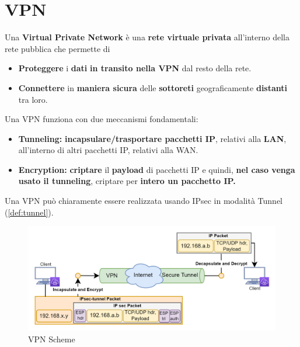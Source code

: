 \section{VPN}
Una \textbf{Virtual Private Network} è una \textbf{rete virtuale privata} all'interno della rete pubblica che permette di 
\begin{itemize}
    \item \textbf{Proteggere} i \textbf{dati} \textbf{in transito nella VPN} dal resto della rete.
    \item \textbf{Connettere} in \textbf{maniera sicura} delle \textbf{sottoreti} geograficamente \textbf{distanti} tra loro.
\end{itemize}
Una VPN funziona con due meccanismi fondamentali:
\begin{itemize}
    \item \textbf{Tunneling:} \textbf{incapsulare/trasportare pacchetti IP}, relativi alla \textbf{LAN}, all'interno di altri pacchetti IP, relativi alla WAN.
    \item \textbf{Encryption:} \textbf{criptare} il \textbf{payload} di pacchetti IP e quindi, \textbf{nel caso venga usato il tunneling}, criptare per \textbf{intero un pacchetto IP.}
\end{itemize}
Una VPN può chiaramente essere realizzata usando IPsec in modalità Tunnel (\cref{def:tunnel}).
\begin{figure}[h]
    \centering
    \includegraphics{image/vpn.png}
    \caption{VPN Scheme}
    \label{fig:vpn}
\end{figure}